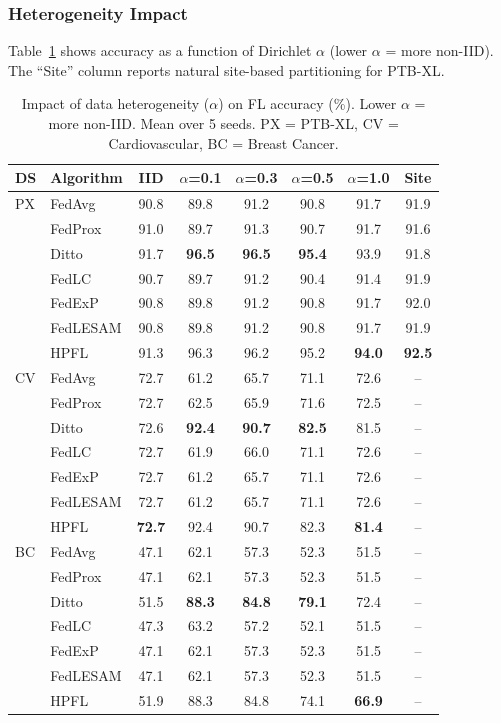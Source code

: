 \documentclass[conference]{IEEEtran}
\begin{document}
\subsubsection{Heterogeneity Impact}

Table~\ref{tab:heterogeneity} shows accuracy as a function of Dirichlet $\alpha$ (lower $\alpha$ = more non-IID). The ``Site'' column reports natural site-based partitioning for PTB-XL.

\begin{table}[t]
\centering
\caption{Impact of data heterogeneity ($\alpha$) on FL accuracy (\%). Lower $\alpha$ = more non-IID. Mean over 5 seeds. PX = PTB-XL, CV = Cardiovascular, BC = Breast Cancer.}
\label{tab:heterogeneity}
\small
\begin{tabular}{llcccccc}
\toprule
\textbf{DS} & \textbf{Algorithm} & \textbf{IID} & \textbf{$\alpha$=0.1} & \textbf{$\alpha$=0.3} & \textbf{$\alpha$=0.5} & \textbf{$\alpha$=1.0} & \textbf{Site} \\
\midrule
PX & FedAvg & 90.8 & 89.8 & 91.2 & 90.8 & 91.7 & 91.9 \\
 & FedProx & 91.0 & 89.7 & 91.3 & 90.7 & 91.7 & 91.6 \\
 & Ditto & 91.7 & \textbf{96.5} & \textbf{96.5} & \textbf{95.4} & 93.9 & 91.8 \\
 & FedLC & 90.7 & 89.7 & 91.2 & 90.4 & 91.4 & 91.9 \\
 & FedExP & 90.8 & 89.8 & 91.2 & 90.8 & 91.7 & 92.0 \\
 & FedLESAM & 90.8 & 89.8 & 91.2 & 90.8 & 91.7 & 91.9 \\
 & HPFL & 91.3 & 96.3 & 96.2 & 95.2 & \textbf{94.0} & \textbf{92.5} \\
\midrule
CV & FedAvg & 72.7 & 61.2 & 65.7 & 71.1 & 72.6 & -- \\
 & FedProx & 72.7 & 62.5 & 65.9 & 71.6 & 72.5 & -- \\
 & Ditto & 72.6 & \textbf{92.4} & \textbf{90.7} & \textbf{82.5} & 81.5 & -- \\
 & FedLC & 72.7 & 61.9 & 66.0 & 71.1 & 72.6 & -- \\
 & FedExP & 72.7 & 61.2 & 65.7 & 71.1 & 72.6 & -- \\
 & FedLESAM & 72.7 & 61.2 & 65.7 & 71.1 & 72.6 & -- \\
 & HPFL & \textbf{72.7} & 92.4 & 90.7 & 82.3 & \textbf{81.4} & -- \\
\midrule
BC & FedAvg & 47.1 & 62.1 & 57.3 & 52.3 & 51.5 & -- \\
 & FedProx & 47.1 & 62.1 & 57.3 & 52.3 & 51.5 & -- \\
 & Ditto & 51.5 & \textbf{88.3} & \textbf{84.8} & \textbf{79.1} & 72.4 & -- \\
 & FedLC & 47.3 & 63.2 & 57.2 & 52.1 & 51.5 & -- \\
 & FedExP & 47.1 & 62.1 & 57.3 & 52.3 & 51.5 & -- \\
 & FedLESAM & 47.1 & 62.1 & 57.3 & 52.3 & 51.5 & -- \\
 & HPFL & 51.9 & 88.3 & 84.8 & 74.1 & \textbf{66.9} & -- \\
\bottomrule
\end{tabular}
\end{table}
\end{document}
